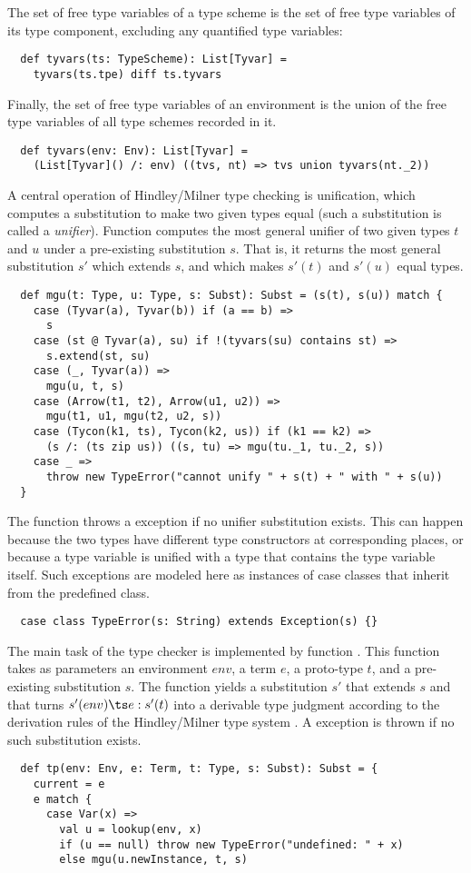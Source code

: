 {The set of free type variables of a type scheme is the set of free
type variables of its type component, excluding any quantified type variables:
\begin{lstlisting}
  def tyvars(ts: TypeScheme): List[Tyvar] = 
    tyvars(ts.tpe) diff ts.tyvars
\end{lstlisting}
Finally, the set of free type variables of an environment is the union
of the free type variables of all type schemes recorded in it.
\begin{lstlisting}
  def tyvars(env: Env): List[Tyvar] =
    (List[Tyvar]() /: env) ((tvs, nt) => tvs union tyvars(nt._2))
\end{lstlisting}
A central operation of Hindley/Milner type checking is unification,
which computes a substitution to make two given types equal (such a
substitution is called a {\em unifier}).  Function  computes
the most general unifier of two given types $t$ and $u$ under a
pre-existing substitution $s$.  That is, it returns the most general
substitution $s'$ which extends $s$, and which makes $s'(t)$ and
$s'(u)$ equal types. 
\begin{lstlisting}
  def mgu(t: Type, u: Type, s: Subst): Subst = (s(t), s(u)) match {
    case (Tyvar(a), Tyvar(b)) if (a == b) =>
      s
    case (st @ Tyvar(a), su) if !(tyvars(su) contains st) =>
      s.extend(st, su)
    case (_, Tyvar(a)) =>
      mgu(u, t, s)
    case (Arrow(t1, t2), Arrow(u1, u2)) =>
      mgu(t1, u1, mgu(t2, u2, s))
    case (Tycon(k1, ts), Tycon(k2, us)) if (k1 == k2) =>
      (s /: (ts zip us)) ((s, tu) => mgu(tu._1, tu._2, s))
    case _ => 
      throw new TypeError("cannot unify " + s(t) + " with " + s(u))
  }
\end{lstlisting}
The  function throws a  exception if no
unifier substitution exists. This can happen because the two types
have different type constructors at corresponding places, or because a
type variable is unified with a type that contains the type variable
itself. Such exceptions are modeled here as instances of case classes
that inherit from the predefined  class.
\begin{lstlisting}
  case class TypeError(s: String) extends Exception(s) {}
\end{lstlisting}
The main task of the type checker is implemented by function
. This function takes as parameters an environment $env$, a
term $e$, a proto-type $t$, and a
pre-existing substitution $s$.  The function yields a substitution
$s'$ that extends $s$ and that
turns $s'(env) \ts e: s'(t)$ into a derivable type judgment according
to the derivation rules of the Hindley/Milner type system \cite{milner:polymorphism}.  A
 exception is thrown if no such substitution exists.
\begin{lstlisting}
  def tp(env: Env, e: Term, t: Type, s: Subst): Subst = {
    current = e
    e match {
      case Var(x) =>
        val u = lookup(env, x)
        if (u == null) throw new TypeError("undefined: " + x)
        else mgu(u.newInstance, t, s)


\end{lstlisting}}
